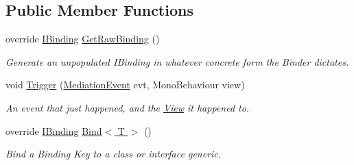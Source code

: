 \subsection*{Public Member Functions}
\begin{DoxyCompactItemize}
\item 
\hypertarget{classstrange_1_1extensions_1_1mediation_1_1impl_1_1_mediation_binder_a8979dac1fe07f85a453ecb0b43cd9c48}{override \hyperlink{interfacestrange_1_1framework_1_1api_1_1_i_binding}{I\-Binding} \hyperlink{classstrange_1_1extensions_1_1mediation_1_1impl_1_1_mediation_binder_a8979dac1fe07f85a453ecb0b43cd9c48}{Get\-Raw\-Binding} ()}\label{classstrange_1_1extensions_1_1mediation_1_1impl_1_1_mediation_binder_a8979dac1fe07f85a453ecb0b43cd9c48}

\begin{DoxyCompactList}\small\item\em Generate an unpopulated I\-Binding in whatever concrete form the Binder dictates. \end{DoxyCompactList}\item 
void \hyperlink{classstrange_1_1extensions_1_1mediation_1_1impl_1_1_mediation_binder_a79447d8fd991688f087c51b752c002cb}{Trigger} (\hyperlink{namespacestrange_1_1extensions_1_1mediation_1_1api_ae5a81bb1edf9fca1d2aca9f4fada72a8}{Mediation\-Event} evt, Mono\-Behaviour view)
\begin{DoxyCompactList}\small\item\em An event that just happened, and the \hyperlink{classstrange_1_1extensions_1_1mediation_1_1impl_1_1_view}{View} it happened to. \end{DoxyCompactList}\item 
\hypertarget{classstrange_1_1extensions_1_1mediation_1_1impl_1_1_mediation_binder_a09f66b1d01dca93a0bad43c83d6c03cb}{override \hyperlink{interfacestrange_1_1framework_1_1api_1_1_i_binding}{I\-Binding} \hyperlink{classstrange_1_1extensions_1_1mediation_1_1impl_1_1_mediation_binder_a09f66b1d01dca93a0bad43c83d6c03cb}{Bind$<$ T $>$} ()}\label{classstrange_1_1extensions_1_1mediation_1_1impl_1_1_mediation_binder_a09f66b1d01dca93a0bad43c83d6c03cb}

\begin{DoxyCompactList}\small\item\em Bind a Binding Key to a class or interface generic. \end{DoxyCompactList}\end{DoxyCompactItemize}
